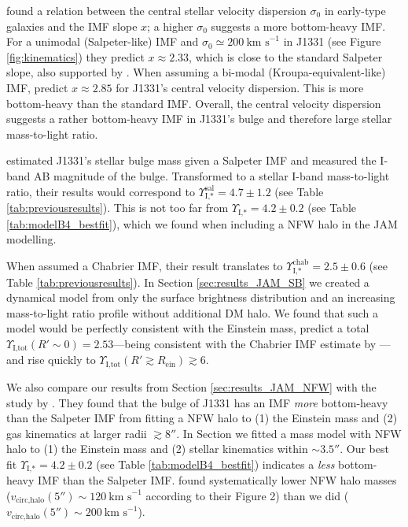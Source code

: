 \documentclass[useAMS,usenatbib]{mnras}
\begin{document}
\citet{Ferreras} found a relation between the central stellar velocity dispersion $\sigma_0$ in early-type galaxies and the IMF slope $x$; a higher $\sigma_0$ suggests a more bottom-heavy IMF. For a unimodal (Salpeter-like) IMF and $\sigma_0 \simeq 200~\text{km s}^{-1}$ in J1331 (see Figure \ref{fig:kinematics}) they predict $x \approx 2.33$, which is close to the standard Salpeter slope, also supported by \citet{2014MNRAS.438.1483S}. When assuming a bi-modal (Kroupa-equivalent-like) IMF, \citet{Ferreras} predict $x \approx 2.85$ for J1331's central velocity dispersion. This is more bottom-heavy than the standard \citet{2002Sci...295...82K} IMF. Overall, the central velocity dispersion suggests a rather bottom-heavy IMF in J1331's bulge and therefore large stellar mass-to-light ratio. 

\citet{SWELLSI} estimated J1331's stellar bulge mass given a Salpeter IMF and measured the I-band AB magnitude of the bulge. Transformed to a stellar I-band mass-to-light ratio, their results would correspond to $\Upsilon_\text{I,*}^\text{sal} = 4.7 \pm 1.2$ (see Table \ref{tab:previousresults}). This is not too far from $\Upsilon_\text{I,*} = 4.2 \pm 0.2$ (see Table \ref{tab:modelB4_bestfit}), which we found when including a NFW halo in the JAM modelling.

When \citet{SWELLSI} assumed a Chabrier IMF, their result translates to $\Upsilon_\text{I,*}^\text{chab} = 2.5 \pm 0.6$ (see Table \ref{tab:previousresults}). In Section \ref{sec:results_JAM_SB} we created a dynamical model from only the surface brightness distribution and an increasing mass-to-light ratio profile without additional DM halo. We found that such a model would be perfectly consistent with the Einstein mass, predict a total $\Upsilon_\text{I,tot}(R'\sim0) = 2.53$---being consistent with the Chabrier IMF estimate by \citet{SWELLSI}---and rise quickly to $\Upsilon_\text{I,tot}(R'\gtrsim R_\text{ein}) \gtrsim 6$.

We also compare our results from Section \ref{sec:results_JAM_NFW} with the study by \citet{SWELLSV}. They found that the bulge of J1331 has an IMF \emph{more} bottom-heavy than the Salpeter IMF from fitting a NFW halo to (1) the Einstein mass and (2) gas kinematics at larger radii $\gtrsim 8''$. In Section we fitted a mass model with NFW halo to (1) the Einstein mass and (2) stellar kinematics within $\sim 3.5''$. Our best fit $\Upsilon_\text{I,*} = 4.2 \pm 0.2$ (see Table \ref{tab:modelB4_bestfit}) indicates a \emph{less} bottom-heavy IMF than the Salpeter IMF. \cite{SWELLSV} found systematically lower NFW halo masses ($v_\text{circ,halo}(5'') \sim 120~\text{km s}^{-1}$ according to their Figure 2) than we did ($v_\text{circ,halo}(5'') \sim 200~\text{km s}^{-1}$).
\end{document}
